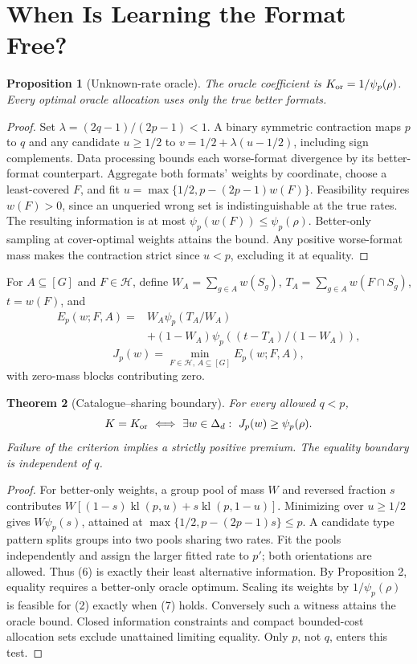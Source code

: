 \documentclass[sigconf,anonymous,review]{acmart}
\newtheorem{theorem}{Theorem}
\newtheorem{proposition}[theorem]{Proposition}
\DeclareMathOperator{\kl}{kl}
\begin{document}
\section{When Is Learning the Format Free?}
\begin{proposition}[Unknown-rate oracle] The oracle coefficient is $K_{\rm or}=1/\psi_p(\rho)$. Every optimal oracle allocation uses only the true better formats.\end{proposition}
\begin{proof} Set $\lambda=(2q-1)/(2p-1)<1$. A binary symmetric contraction maps $p$ to $q$ and any candidate $u\ge1/2$ to $v=1/2+\lambda(u-1/2)$, including sign complements. Data processing bounds each worse-format divergence by its better-format counterpart. Aggregate both formats' weights by coordinate, choose a least-covered $F$, and fit $u=\max\{1/2,p-(2p-1)w(F)\}$. Feasibility requires $w(F)>0$, since an unqueried wrong set is indistinguishable at the true rates. The resulting information is at most $\psi_p(w(F))\le\psi_p(\rho)$. Better-only sampling at cover-optimal weights attains the bound. Any positive worse-format mass makes the contraction strict since $u<p$, excluding it at equality.\end{proof}
For $A\subseteq[G]$ and $F\in\mathcal H$, define $W_A=\sum_{g\in A}w(S_g)$, $T_A=\sum_{g\in A}w(F\cap S_g)$, $t=w(F)$, and
\begin{equation}\begin{split}E_p(w;F,A)={}&W_A\psi_p(T_A/W_A)\\&+(1-W_A)\psi_p((t-T_A)/(1-W_A)),\end{split}\end{equation}
\begin{equation}J_p(w)=\min_{F\in\mathcal H,\,A\subseteq[G]} E_p(w;F,A),\end{equation}
with zero-mass blocks contributing zero.
\begin{theorem}[Catalogue--sharing boundary] For every allowed $q<p$,
\begin{equation}K=K_{\rm or}\ \Longleftrightarrow\ \exists w\in\Delta_d:\ J_p(w)\ge\psi_p(\rho).\end{equation}
Failure of the criterion implies a strictly positive premium. The equality boundary is independent of $q$.
\end{theorem}
\begin{proof} For better-only weights, a group pool of mass $W$ and reversed fraction $s$ contributes $W[(1-s)\kl(p,u)+s\kl(p,1-u)]$. Minimizing over $u\ge1/2$ gives $W\psi_p(s)$, attained at $\max\{1/2,p-(2p-1)s\}\le p$. A candidate type pattern splits groups into two pools sharing two rates. Fit the pools independently and assign the larger fitted rate to $p'$; both orientations are allowed. Thus (6) is exactly their least alternative information. By Proposition 2, equality requires a better-only oracle optimum. Scaling its weights by $1/\psi_p(\rho)$ is feasible for (2) exactly when (7) holds. Conversely such a witness attains the oracle bound. Closed information constraints and compact bounded-cost allocation sets exclude unattained limiting equality. Only $p$, not $q$, enters this test.\end{proof}
\end{document}
